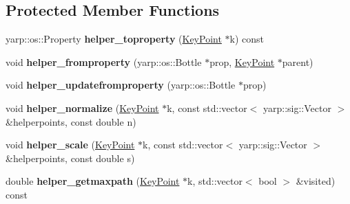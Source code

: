 \subsection*{Protected Member Functions}
\begin{DoxyCompactItemize}
\item 
\mbox{\label{classassistive__rehab_1_1Skeleton_ae448d21825bfd36eccb328d16fef995a}} 
yarp\+::os\+::\+Property {\bfseries helper\+\_\+toproperty} (\mbox{\hyperlink{classassistive__rehab_1_1KeyPoint}{Key\+Point}} $\ast$k) const
\item 
\mbox{\label{classassistive__rehab_1_1Skeleton_a8e8fcac9b911ce9eaa0a97b81bffb357}} 
void {\bfseries helper\+\_\+fromproperty} (yarp\+::os\+::\+Bottle $\ast$prop, \mbox{\hyperlink{classassistive__rehab_1_1KeyPoint}{Key\+Point}} $\ast$parent)
\item 
\mbox{\label{classassistive__rehab_1_1Skeleton_a8b1fa988e848ef1fc06439be8eaa19a4}} 
void {\bfseries helper\+\_\+updatefromproperty} (yarp\+::os\+::\+Bottle $\ast$prop)
\item 
\mbox{\label{classassistive__rehab_1_1Skeleton_a574ad07752a2a59ea765e10282998bb4}} 
void {\bfseries helper\+\_\+normalize} (\mbox{\hyperlink{classassistive__rehab_1_1KeyPoint}{Key\+Point}} $\ast$k, const std\+::vector$<$ yarp\+::sig\+::\+Vector $>$ \&helperpoints, const double n)
\item 
\mbox{\label{classassistive__rehab_1_1Skeleton_aefdf8624092fcc2b5458b0be108da01a}} 
void {\bfseries helper\+\_\+scale} (\mbox{\hyperlink{classassistive__rehab_1_1KeyPoint}{Key\+Point}} $\ast$k, const std\+::vector$<$ yarp\+::sig\+::\+Vector $>$ \&helperpoints, const double s)
\item 
\mbox{\label{classassistive__rehab_1_1Skeleton_a66ea19f4fbec2b654e394686180abf43}} 
double {\bfseries helper\+\_\+getmaxpath} (\mbox{\hyperlink{classassistive__rehab_1_1KeyPoint}{Key\+Point}} $\ast$k, std\+::vector$<$ bool $>$ \&visited) const
\end{DoxyCompactItemize}
